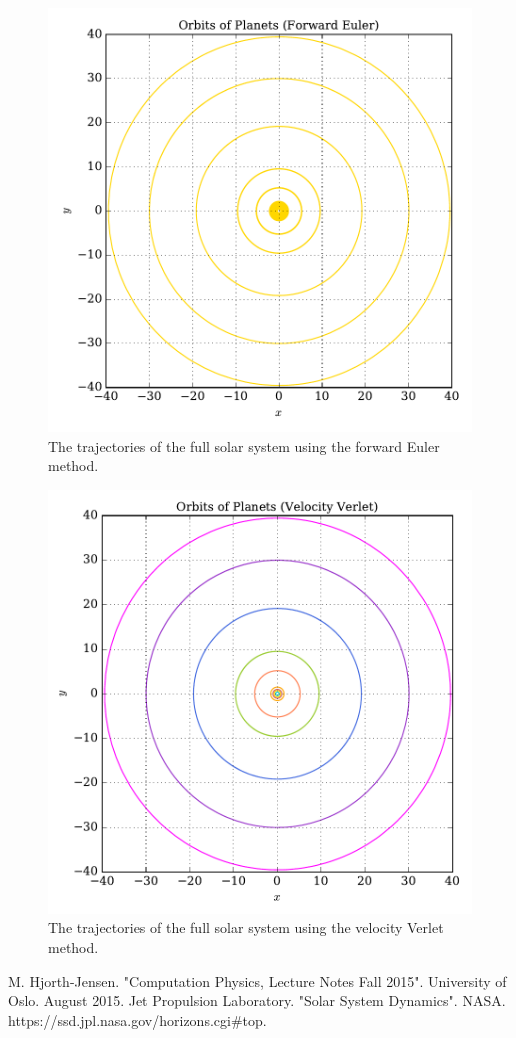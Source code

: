 \documentclass[prb,aps,twocolumn,showpacs,10pt]{revtex4-1}
\begin{document}
\begin{center}
\begin{figure}
\includegraphics[scale=0.7]{solar_system_euler_orbit.pdf}
\caption{The trajectories of the full solar system using the forward Euler method.}
\end{figure}
\end{center}
\begin{center}
\begin{figure}
\includegraphics[scale=0.7]{solar_system_vv_orbit.pdf}
\caption{The trajectories of the full solar system using the velocity Verlet method.}
\end{figure}
\end{center}


\begin{references}
 M. Hjorth-Jensen. "Computation Physics, Lecture Notes Fall 2015". University of Oslo. August 2015.
 Jet Propulsion Laboratory. "Solar System Dynamics". NASA. https://ssd.jpl.nasa.gov/horizons.cgi\#top.
\end{references}
\end{document}
